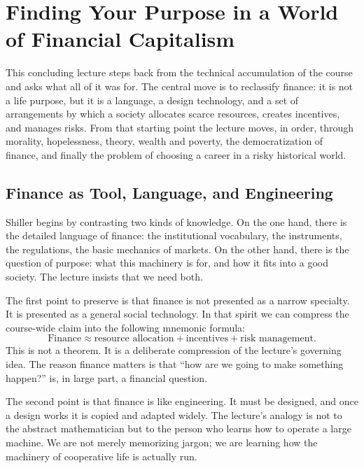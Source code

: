 \chapter{Finding Your Purpose in a World of Financial Capitalism}

This concluding lecture steps back from the technical accumulation of the course and asks what all of it was for. The central move is to reclassify finance: it is not a life purpose, but it is a language, a design technology, and a set of arrangements by which a society allocates scarce resources, creates incentives, and manages risks. From that starting point the lecture moves, in order, through morality, hopelessness, theory, wealth and poverty, the democratization of finance, and finally the problem of choosing a career in a risky historical world.

\section{Finance as Tool, Language, and Engineering}

Shiller begins by contrasting two kinds of knowledge. On the one hand, there is the detailed language of finance: the institutional vocabulary, the instruments, the regulations, the basic mechanics of markets. On the other hand, there is the question of purpose: what this machinery is for, and how it fits into a good society. The lecture insists that we need both.

The first point to preserve is that finance is not presented as a narrow specialty. It is presented as a general social technology. In that spirit we can compress the course-wide claim into the following mnemonic formula:
\begin{equation}
\text{Finance} \approx \text{resource allocation} + \text{incentives} + \text{risk management}.
\end{equation}
This is not a theorem. It is a deliberate compression of the lecture's governing idea. The reason finance matters is that ``how are we going to make something happen?'' is, in large part, a financial question.

The second point is that finance is like engineering. It must be designed, and once a design works it is copied and adapted widely. The lecture's analogy is not to the abstract mathematician but to the person who learns how to operate a large machine. We are not merely memorizing jargon; we are learning how the machinery of cooperative life is actually run.

